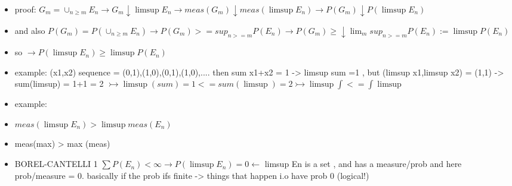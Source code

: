 \documentclass[10pt,landscape,a4paper]{article}
\begin{document}
\begin{multicols*}{3}
\begin{spacing}{0.5}
\begin{itemize}
\item proof: $ G_m = \cup_{n \ge m} E_n \rightarrow G_m \downarrow \limsup E_n \rightarrow meas(G_m) \downarrow meas (\limsup E_n) \rightarrow P(G_m) \downarrow P(\limsup E_n) $ 
\item  and also $P(G_m) = P(\cup_{n \ge m} E_n) \rightarrow P(G_m) >= sup_{n >=m} P(E_n) \rightarrow P(G_m) \ge \downarrow \lim_m sup_{n >=m} P(E_n) := \limsup P(E_n) $
\item  so $\rightarrow P(\limsup E_n) \ge \limsup P(E_n)$

\item example: (x1,x2) sequence = (0,1),(1,0),(0,1),(1,0),.... then sum x1+x2 = 1 -> limsup sum =1 , but (limsup x1,limsup x2) = (1,1) -> sum(limsup) = 1+1 = 2 $ \rightarrowtail \limsup (sum) =1 <= sum (\limsup) = 2\rightarrowtail \limsup \int <= \int \limsup$


\item example: 
\item $ \boxed{meas( \limsup E_n) > \limsup meas(E_n) }$ 
\item  meas(max) > max (meas)





\item \colorbox{blue!10}{BOREL-CANTELLI 1}  $ \boxed{\sum P(E_n) < \infty \rightarrow P(\limsup E_n) = 0 } \leftarrow$ limsup En is a set , and has a measure/prob and here prob/measure = 0. basically if the prob ifs finite -> things that happen i.o have prob 0 (logical!)


\end{itemize}
\end{spacing}
\end{multicols*}
\end{document}
